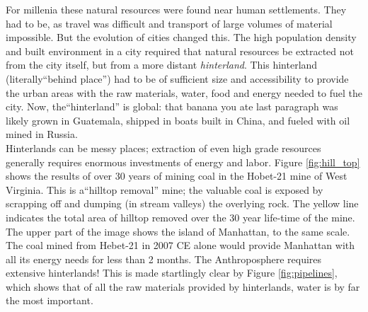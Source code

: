 For millenia these natural resources were found near human settlements. They had to be, as travel was difficult and transport of large volumes of material impossible. But the evolution of cities changed this. The high population density and built environment in a city required that natural resources be extracted not from the city itself, but from a  more distant \emph{hinterland}. This hinterland (literally``behind place'') had to be of sufficient size and accessibility to provide the urban areas with the raw materials, water, food and energy needed to fuel the city. Now, the``hinterland'' is global: that banana you ate last paragraph was likely grown in Guatemala, shipped in boats built in China, and fueled with oil mined in Russia.\\

Hinterlands can be messy places; extraction of even high grade resources generally requires enormous investments of energy and labor. Figure \ref{fig:hill_top} shows the results of over 30 years of mining coal in the Hobet-21 mine of West Virginia. This is a``hilltop removal'' mine; the valuable coal is exposed by scrapping off and dumping (in stream valleys) the overlying rock. The yellow line indicates the total area of hilltop removed over the 30 year life-time of the mine. The upper part of the image shows the island of Manhattan, to the same scale. The coal mined from Hebet-21 in 2007 CE alone would provide Manhattan with all its energy needs for less than 2 months. The Anthroposphere requires extensive hinterlands! This is made startlingly clear by Figure \ref{fig:pipelines}, which shows that of all the raw materials provided by hinterlands, water is by far the most important. \\

